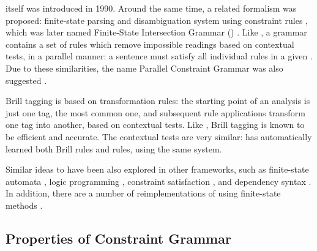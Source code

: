 \onlycg{} itself was introduced in 1990. Around the same time, a related
formalism was proposed: finite-state parsing and disambiguation system
using constraint rules \cite{koskenniemi90}, which was later named
Finite-State Intersection Grammar (\fsig{}) \cite{piitulainen1995}.
Like \onlycg{}, a \fsig{} grammar contains a set of rules which remove
impossible readings based on contextual tests, in a parallel manner: a
sentence must satisfy all individual rules in a given \fsig{}.  Due to
these similarities, the name Parallel Constraint Grammar was also
suggested \cite{koskenniemi97}.

Brill tagging \cite{brill1995} is based on transformation rules: the
starting point of an analysis is just one tag, the most common one,
and subsequent rule applications transform one tag into another, based
on contextual tests. Like \onlycg{}, Brill tagging is known to be efficient
and accurate. The contextual tests are very similar: 
\citet{lager01transformation} has automatically learned both Brill rules and \onlycg{} rules, using the same system.

Similar ideas to \onlycg{} have been also explored in other frameworks, such as finite-state automata \cite{gross1997local,grana2003fst},
logic programming \cite{oflazer97votingconstraints,lager98}, 
constraint satisfaction \cite{padro1996csp}, 
and dependency syntax \cite{tapanainen97fdg}. 
 In addition, there are a number of reimplementations of \onlycg{} using finite-state methods \cite{yli-jyra2011cg_engine,hulden2011cg_engine,peltonen2011}. 

\subsection{Properties of Constraint Grammar}\label{sec:properties}

